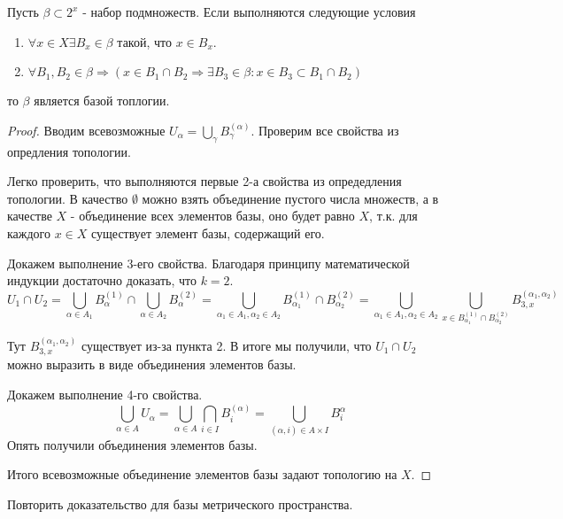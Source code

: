 \begin{lemma}
    Пусть $\beta \subset 2^x$ - набор подмножеств. Если выполняются следующие условия
    \begin{enumerate}
        \item $\forall x \in X \exists B_x \in \beta$ такой, что $x \in B_x$.
        \item $\forall B_1, B_2 \in \beta \Rightarrow (x \in B_1 \cap B_2 \Rightarrow \exists B_3 \in \beta : x \in B_3 \subset B_1 \cap B_2)$ 
    \end{enumerate}
    то $\beta$ является базой топлогии.
\end{lemma}
\begin{proof}
    Вводим всевозможные $U_{\alpha} = \bigcup_{\gamma} B_{\gamma}^{(\alpha)}$. Проверим все свойства из опредления топологии.

    Легко проверить, что выполняются первые 2-а свойства из опредедления топологии. В качество $\emptyset$ можно взять объединение пустого числа множеств, а в качестве $X$ - объединение всех элементов базы, оно будет равно $X$, т.к. для каждого $x \in X$ существует элемент базы, содержащий его.

    Докажем выполнение 3-его свойства. Благодаря принципу математической индукции достаточно доказать, что $k = 2$.
    \[
        U_1 \cap U_2 = \bigcup_{\alpha \in A_1} B_{\alpha}^{(1)} \cap \bigcup_{\alpha \in A_2} B_{\alpha}^{(2)} = \bigcup_{\alpha_1 \in A_1, \alpha_2 \in A_2} B_{\alpha_1}^{(1)} \cap B_{\alpha_2}^{(2)} = \bigcup_{\alpha_1 \in A_1, \alpha_2 \in A_2} \bigcup_{x \in B_{\alpha_1}^{(1)} \cap B_{\alpha_2}^{(2)}} B_{3, x}^{(\alpha_1, \alpha_2)}
    \]

    Тут $B_{3, x}^{(\alpha_1, \alpha_2)}$ существует из-за пункта 2. В итоге мы получили, что $U_1 \cap U_2$ можно выразить в виде объединения элементов базы.
    
    Докажем выполнение 4-го свойства.
    \[
        \bigcup_{\alpha \in A} U_{\alpha} = \bigcup_{\alpha \in A} \bigcap_{i \in I} B_i^{(\alpha)} = \bigcup_{(\alpha, i) \in A \times I} B_i^{\alpha}
    \]
    Опять получили объединения элементов базы.

    Итого всевозможные объединение элементов базы задают топологию на $X$.
\end{proof}

\begin{exercise}
    Повторить доказательство для базы метрического пространства.
\end{exercise}

